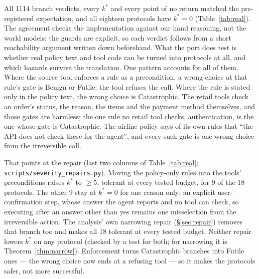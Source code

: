 \documentclass[a4paper,UKenglish,cleveref,autoref,thm-restate,anonymous]{lipics-v2021}
\newcommand{\Ben}{\textsf{Benign}}
\newcommand{\Fut}{\textsf{Futile}}
\newcommand{\Cat}{\textsf{Catastrophic}}
\newcommand{\kstar}{k^{*}}
\begin{document}
All 1114 branch verdicts, every $\kstar$ and every point of no return matched
the pre-registered expectation, and all eighteen protocols have $\kstar=0$
(Table~\ref{tab:real}). The agreement checks the implementation against our hand
reasoning, not the world models: the guards are explicit, so each verdict follows
from a short reachability argument written down beforehand. What the port does
test is whether real policy text and tool code can be turned into protocols at
all, and which hazards survive the translation. One pattern accounts for all of
them. Where the source tool enforces a rule as a precondition, a wrong choice at
that rule's gate is \Ben{} or \Fut{}: the tool refuses the call. Where the rule is
stated only in the policy text, the wrong choice is \Cat. The retail tools check
an order's status, the reason, the items and the payment method themselves, and
those gates are harmless; the one rule no retail tool checks, authentication, is
the one whose gate is \Cat. The airline policy says of its own rules that ``the
API does not check these for the agent'', and every such gate is one wrong
choice from the irreversible call.

That points at the repair (last two columns of Table~\ref{tab:real};
\texttt{scripts/severity\_repairs.py}). Moving the policy-only rules into the
tools' preconditions raises $\kstar$ to $\ge5$, tolerant at every tested budget,
for 9 of the 18 protocols. The other 9 stay at $\kstar=0$ for one reason only:
an explicit user-confirmation step, whose answer the agent reports and no tool
can check, so executing after an answer other than yes remains one misselection
from the irreversible action. The analysis' own narrowing repair
(\S\ref{sec:repair}) removes that branch too and makes all 18 tolerant at every
tested budget. Neither repair lowers $\kstar$ on any protocol (checked by a test
for both; for narrowing it is Theorem~\ref{thm:narrow}).
Enforcement turns \Cat{} branches into \Fut{} ones --- the wrong choice now ends
at a refusing tool --- so it makes the protocols safer, not more successful.
\end{document}
